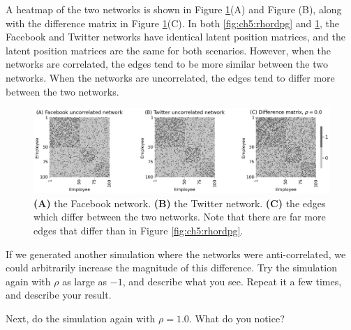 A heatmap of the two networks is shown in Figure \ref{fig:ch5:norhordpg}(A) and Figure (B), along with the difference matrix in Figure \ref{fig:ch5:norhordpg}(C). In both \ref{fig:ch5:rhordpg} and \ref{fig:ch5:norhordpg}, the Facebook and Twitter networks have {identical} latent position matrices, and the latent position matrices are the same for both scenarios. However, when the networks are correlated, the edges tend to be more similar between the two networks. When the networks are uncorrelated, the edges tend to differ more between the two networks. 

\begin{figure}[h]
    \centering
    \includegraphics[width=\linewidth]{representations/ch5/Images/norhordpg.png}
    \caption[Uncorrelated RDPGs]{\textbf{(A)} the Facebook network. \textbf{(B)} the Twitter network. \textbf{(C)} the edges which differ between the two networks. Note that there are far more edges that differ than in Figure \ref{fig:ch5:rhordpg}.}
    \label{fig:ch5:norhordpg}
\end{figure}

\begin{floatingbox}[h]\caption{Negative $\rho$-correlated RDPGs}
If we generated another simulation where the networks were anti-correlated, we could arbitrarily increase the magnitude of this difference. Try the simulation again with $\rho$ as large as $-1$, and describe what you see. Repeat it a few times, and describe your result.

Next, do the simulation again with $\rho = 1.0$. What do you notice?
\end{floatingbox}

\newpage